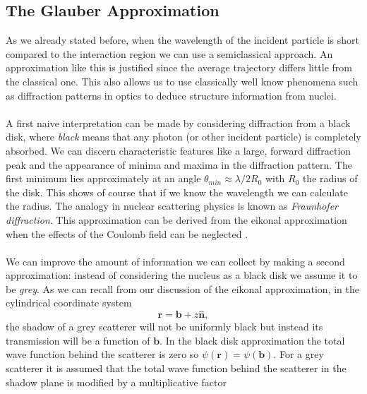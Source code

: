 \documentclass[11pt]{article}
\numberwithin{equation}{section}
\begin{document}
\subsection{The Glauber Approximation}
As we already stated before, when the wavelength of the incident particle is short compared to the interaction region we can use a semiclassical approach. An approximation like this is justified since the average trajectory differs little from the classical one. This also allows us to use classically well know phenomena such as diffraction patterns in optics to deduce structure information from nuclei. \\ \\
\noindent
A first naive interpretation can be made by considering diffraction from a black disk, where \emph{black} means that any photon (or other incident particle) is completely absorbed. We can discern characteristic features like a large, forward diffraction peak and the appearance of minima and maxima in the diffraction pattern. The first minimum lies approximately at an angle $\theta_{min} \approx \lambda/2R_0$ with $R_0$ the radius of the disk. This shows of course that if we know the wavelength we can calculate the radius. The analogy in nuclear scattering physics is known as \emph{Fraunhofer diffraction}. This approximation can be derived from the eikonal approximation when the effects of the Coulomb field can be neglected \cite{Satchler80}. \\ \\
\noindent
We can improve the amount of information we can collect by making a second approximation: instead of considering the nucleus as a black disk we assume it to be \emph{grey}. As we can recall from our discussion of the eikonal approximation, in the cylindrical coordinate system 
\begin{equation}
	\mathbf{r} = \mathbf{b} + z\mathbf{\hat{n}},
\end{equation}
the shadow of a grey scatterer will not be uniformly black but instead its transmission will be a function of $\mathbf{b}$. In the black disk approximation the total wave function behind the scatterer is zero so $\psi(\mathbf{r}) = \psi(\mathbf{b})$. For a grey scatterer it is assumed that the total wave function behind the scatterer in the shadow plane is modified by a multiplicative factor \cite{Henley06}
\end{document}
